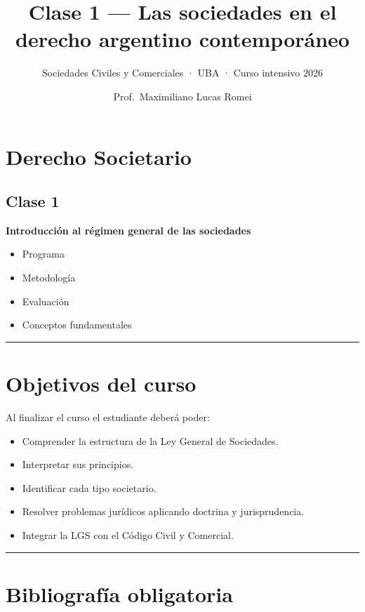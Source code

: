 \documentclass[
  spanish,
  letterpaper,
  DIV=11,
  numbers=noendperiod]{scrartcl}
\title{Clase 1 --- Las sociedades en el derecho argentino contemporáneo}
\subtitle{Sociedades Civiles y Comerciales · UBA · Curso intensivo 2026}
\author{Prof.~Maximiliano Lucas Romei}
\date{}
\providecommand{\tightlist}{%
  \setlength{\itemsep}{0pt}\setlength{\parskip}{0pt}}
\begin{document}
\maketitle


\section{Derecho Societario}\label{derecho-societario}

\subsection{Clase 1}\label{clase-1}

\textbf{Introducción al régimen general de las sociedades}

\begin{itemize}
\tightlist
\item
  Programa
\item
  Metodología
\item
  Evaluación
\item
  Conceptos fundamentales
\end{itemize}

\begin{center}\rule{0.5\linewidth}{0.5pt}\end{center}

\section{Objetivos del curso}\label{objetivos-del-curso}

Al finalizar el curso el estudiante deberá poder:

\begin{itemize}
\tightlist
\item
  Comprender la estructura de la Ley General de Sociedades.
\item
  Interpretar sus principios.
\item
  Identificar cada tipo societario.
\item
  Resolver problemas jurídicos aplicando doctrina y jurisprudencia.
\item
  Integrar la LGS con el Código Civil y Comercial.
\end{itemize}

\begin{center}\rule{0.5\linewidth}{0.5pt}\end{center}

\section{Bibliografía obligatoria}\label{bibliografuxeda-obligatoria}
\end{document}
